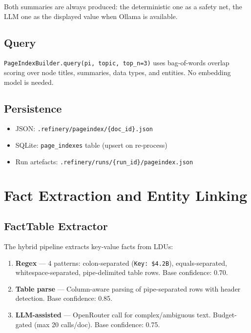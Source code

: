 \documentclass[12pt,a4paper]{article}
\begin{document}
Both summaries are always produced: the deterministic one as a safety net,
the LLM one as the displayed value when Ollama is available.

\subsection{Query}

\texttt{PageIndexBuilder.query(pi, topic, top\_n=3)} uses bag-of-words
overlap scoring over node titles, summaries, data types, and entities.
No embedding model is needed.

\subsection{Persistence}

\begin{itemize}[nosep]
    \item JSON: \texttt{.refinery/pageindex/\{doc\_id\}.json}
    \item SQLite: \texttt{page\_indexes} table (upsert on re-process)
    \item Run artefacts: \texttt{.refinery/runs/\{run\_id\}/pageindex.json}
\end{itemize}


\section{Fact Extraction and Entity Linking}

\subsection{FactTable Extractor}

The hybrid pipeline extracts key-value facts from LDUs:

\begin{enumerate}[nosep]
    \item \textbf{Regex} — 4 patterns: colon-separated (\texttt{Key: \$4.2B}),
          equals-separated, whitespace-separated, pipe-delimited table rows.
          Base confidence: 0.70.
    \item \textbf{Table parse} — Column-aware parsing of pipe-separated
          rows with header detection.  Base confidence: 0.85.
    \item \textbf{LLM-assisted} — OpenRouter call for complex/ambiguous text.
          Budget-gated (max 20 calls/doc).  Base confidence: 0.75.
\end{enumerate}
\end{document}
